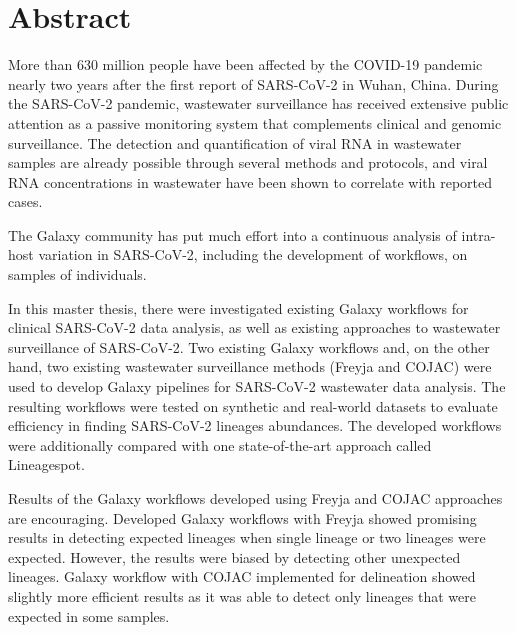 %
\section*{Abstract}

More than 630 million people have been affected by the COVID-19 pandemic nearly two years after the first report of SARS-CoV-2 in Wuhan, China. During the SARS-CoV-2 pandemic, wastewater surveillance has received extensive public attention as a passive monitoring system that complements clinical and genomic surveillance. The detection and quantification of viral RNA in wastewater samples are already possible through several methods and protocols, and viral RNA concentrations in wastewater have been shown to correlate with reported cases.
    
The Galaxy community has put much effort into a continuous analysis of intra-host variation in SARS-CoV-2, including the development of workflows, on samples of individuals.
    
In this master thesis, there were investigated existing Galaxy workflows for clinical SARS-CoV-2 data analysis, as well as existing approaches to wastewater surveillance of SARS-CoV-2. Two existing Galaxy workflows and, on the other hand, two existing wastewater surveillance methods (Freyja and COJAC) were used to develop Galaxy pipelines for SARS-CoV-2 wastewater data analysis. The resulting workflows were tested on synthetic and real-world datasets to evaluate efficiency in finding SARS-CoV-2 lineages abundances. The developed workflows were additionally compared with one state-of-the-art approach called Lineagespot.

Results of the Galaxy workflows developed using Freyja and COJAC approaches are encouraging. Developed Galaxy workflows with Freyja showed promising results in detecting expected lineages when single lineage or two lineages were expected. However, the results were biased by detecting other unexpected lineages. Galaxy workflow with COJAC implemented for delineation showed slightly more efficient results as it was able to detect only lineages that were expected in some samples.


